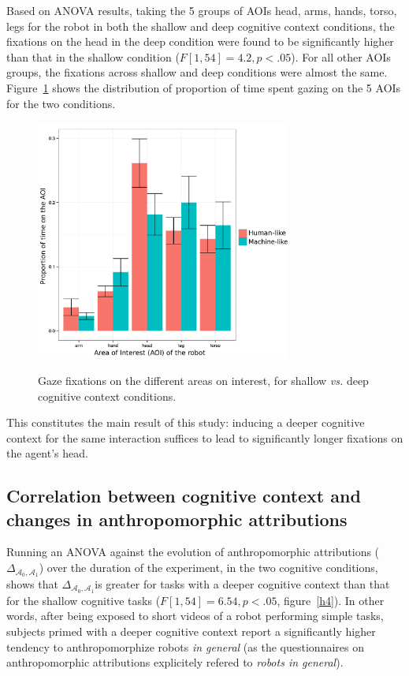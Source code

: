 \documentclass[lettersize, noapacite, twoside, HRI]{apa_HRI}
\newcommand{\vs}{\textit{vs.}\xspace}
\newcommand{\deltaant}{{ $\Delta_{\mathcal{A}_0,\mathcal{A}_1}$\xspace}}
\begin{document}
Based on ANOVA results, taking the 5 groups of AOIs {\sf head}, {\sf arms}, {\sf
hands}, {\sf torso}, {\sf legs} for the robot in both the shallow and deep
cognitive context conditions, the fixations on the head in the deep condition
were found to be significantly higher than that in the shallow condition
($F[1,54] = 4.2, p < .05$). For all other AOIs groups, the fixations across
shallow and deep conditions were almost the same. Figure~\ref{h3} shows the
distribution of proportion of time spent gazing on the 5 AOIs for the two
conditions.

\begin{figure}
    \centering
    \includegraphics[width=3.3in]{GazeHighLow}\label{GazeHighLow}
    \caption{Gaze fixations on the different areas on interest, for shallow \vs
    deep cognitive context conditions.}
    \label{h3}
\end{figure}

This constitutes the main result of this study: inducing a deeper cognitive
context for the same interaction suffices to lead to significantly longer
fixations on the agent's head.

\subsection{Correlation between cognitive context and changes in anthropomorphic
attributions}

Running an ANOVA against the evolution of anthropomorphic attributions
(\deltaant) over the duration of the experiment, in the two cognitive
conditions, shows that \deltaant is greater for tasks with a deeper cognitive
context than that for the shallow cognitive tasks ($F[1,54] = 6.54, p < .05$,
figure~\ref{h4}). In other words, after being exposed to short videos of a robot
performing simple tasks, subjects primed with a deeper cognitive context report
a significantly higher tendency to anthropomorphize robots \emph{in general} (as
the questionnaires on anthropomorphic attributions explicitely refered to
\emph{robots in general}).
\end{document}

